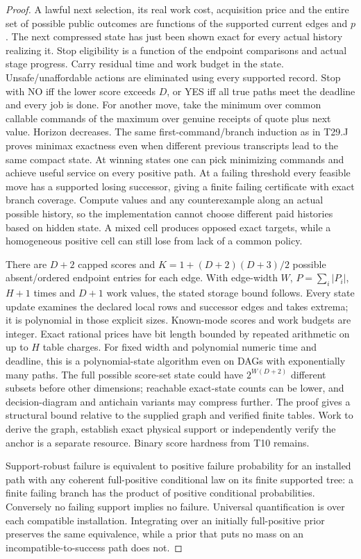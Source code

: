 \begin{proof}
A lawful next selection, its real work cost, acquisition price and the entire set of possible public outcomes are functions of the supported current edges and \(p\). The next compressed state has just been shown exact for every actual history realizing it. Stop eligibility is a function of the endpoint comparisons and actual stage progress. Carry residual time and work budget in the state. Unsafe/unaffordable actions are eliminated using every supported record. Stop with NO iff the lower score exceeds \(D\), or YES iff all true paths meet the deadline and every job is done. For another move, take the minimum over common callable commands of the maximum over genuine receipts of quote plus next value. Horizon decreases. The same first-command/branch induction as in T29.J proves minimax exactness even when different previous transcripts lead to the same compact state. At winning states one can pick minimizing commands and achieve useful service on every positive path. At a failing threshold every feasible move has a supported losing successor, giving a finite failing certificate with exact branch coverage. Compute values and any counterexample along an actual possible history, so the implementation cannot choose different paid histories based on hidden state. A mixed cell produces opposed exact targets, while a homogeneous positive cell can still lose from lack of a common policy.

There are \(D+2\) capped scores and \(K=1+(D+2)(D+3)/2\) possible absent/ordered endpoint entries for each edge. With edge-width \(W\), \(P=\sum_i |P_i|\), \(H+1\) times and \(D+1\) work values, the stated storage bound follows. Every state update examines the declared local rows and successor edges and takes extrema; it is polynomial in those explicit sizes. Known-mode scores and work budgets are integer. Exact rational prices have bit length bounded by repeated arithmetic on up to \(H\) table charges. For fixed width and polynomial numeric time and deadline, this is a polynomial-state algorithm even on DAGs with exponentially many paths. The full possible score-set state could have \(2^{W(D+2)}\) different subsets before other dimensions; reachable exact-state counts can be lower, and decision-diagram and antichain variants may compress further. The proof gives a structural bound relative to the supplied graph and verified finite tables. Work to derive the graph, establish exact physical support or independently verify the anchor is a separate resource. Binary score hardness from T10 remains.

Support-robust failure is equivalent to positive failure probability for an installed path with any coherent full-positive conditional law on its finite supported tree: a finite failing branch has the product of positive conditional probabilities. Conversely no failing support implies no failure. Universal quantification is over each compatible installation. Integrating over an initially full-positive prior preserves the same equivalence, while a prior that puts no mass on an incompatible-to-success path does not.


\end{proof}
